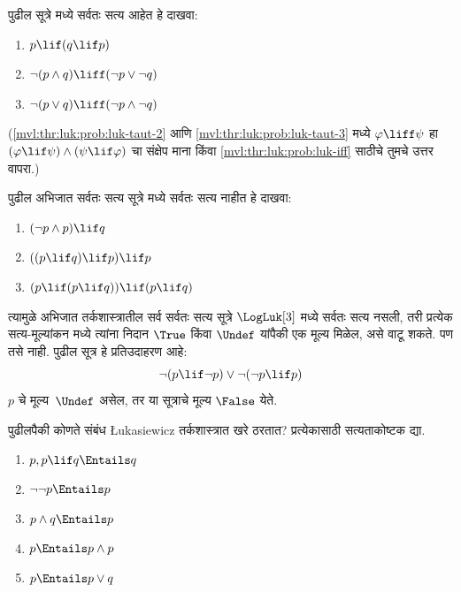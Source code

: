 \begin{prob}
  पुढील सूत्रे \LogLuk[3] मध्ये सर्वतः सत्य आहेत हे दाखवा:
  \begin{enumerate}
    \item $p \lif (q \lif p)$
    \item\label{mvl:thr:luk:prob:luk-taut-2} $\lnot(p \land q) \liff (\lnot p \lor \lnot q)$
    \item\label{mvl:thr:luk:prob:luk-taut-3} $\lnot(p \lor q) \liff (\lnot p \land \lnot q)$
  \end{enumerate}
  (\ref{mvl:thr:luk:prob:luk-taut-2} आणि
  \ref{mvl:thr:luk:prob:luk-taut-3} मध्ये $\varphi \liff \psi$
  हा $(\varphi \lif \psi) \land (\psi \lif \varphi)$ चा संक्षेप माना किंवा
  \ref{mvl:thr:luk:prob:luk-iff} साठीचे तुमचे उत्तर वापरा.)
\end{prob}
\begin{prob}
  पुढील अभिजात सर्वतः सत्य सूत्रे \LogLuk[3] मध्ये सर्वतः सत्य
  नाहीत हे दाखवा:
  \begin{enumerate}
    \item $(\lnot p \land p) \lif q$
    \item $((p \lif q) \lif p) \lif p$
    \item $(p \lif (p \lif q)) \lif (p \lif q)$
  \end{enumerate}
\end{prob}
त्यामुळे अभिजात तर्कशास्त्रातील सर्व सर्वतः सत्य सूत्रे
$\LogLuk[3]$ मध्ये सर्वतः सत्य नसली, तरी प्रत्येक
सत्य-मूल्यांकन मध्ये त्यांना निदान $\True$ किंवा $\Undef$
यांपैकी एक मूल्य मिळेल, असे वाटू शकते. पण तसे नाही.
पुढील सूत्र हे प्रतिउदाहरण आहे:
\[
  \lnot(p \lif \lnot p) \lor \lnot(\lnot p \lif p)
\]
$p$ चे मूल्य~$\Undef$ असेल, तर या सूत्राचे मूल्य $\False$ येते.

\begin{prob}
  पुढीलपैकी कोणते संबंध \L ukasiewicz तर्कशास्त्रात खरे ठरतात?
  प्रत्येकासाठी सत्यताकोष्टक द्या.
  \begin{enumerate}
    \item $p, p \lif q \Entails q$
    \item $\lnot\lnot p \Entails p$
    \item $p \land q \Entails p$
    \item $p \Entails p \land p$
    \item $p \Entails p \lor q$
  \end{enumerate}
\end{prob}

